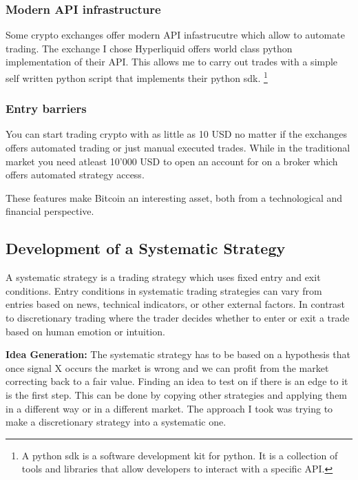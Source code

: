 \documentclass[12pt]{article}
\begin{document}
\subsubsection*{Modern API infrastructure}
Some crypto exchanges offer modern API infastrucutre which allow to automate trading. The exchange I chose Hyperliquid offers world class python implementation of their API. This allows me to carry out trades with a simple self written python script that implements their python sdk. \footnote{A python sdk is a software development kit for python. It is a collection of tools and libraries that allow developers to interact with a specific API.}



\subsubsection*{Entry barriers}
You can start trading crypto with as little as 10 USD no matter if the exchanges offers automated trading or just manual executed trades. While in the traditional market you need atleast 10'000 USD to open an account for on a broker which offers automated strategy access.













These features make Bitcoin an interesting asset, both from a technological and financial perspective.









\newpage




\subsection*{Development of a Systematic Strategy}


A systematic strategy is a trading strategy which uses fixed entry and exit conditions. Entry conditions in systematic trading strategies can vary from entries based on news, technical indicators, or other external factors. In contrast to discretionary trading where the trader decides whether to enter or exit a trade based on human emotion or intuition.

\textbf{Idea Generation:}
The systematic strategy has to be based on a hypothesis that once signal X occurs the market is wrong and we can profit from the market correcting back to a fair value. Finding an idea to test on if there is an edge to it is the first step. This can be done by copying other strategies and applying them in a different way or in a different market. The approach I took was trying to make a discretionary strategy into a systematic one.
\end{document}
